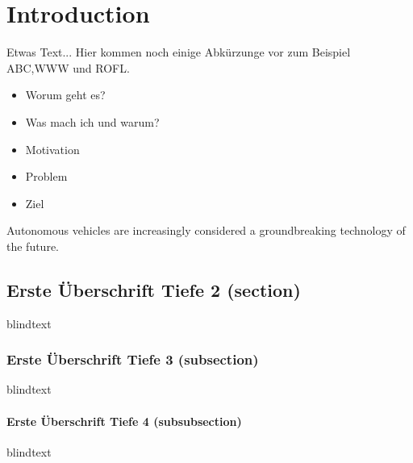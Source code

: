 \chapter{Introduction}
Etwas Text... Hier kommen noch einige Abkürzunge vor zum Beispiel \ac{ABC},\ac{WWW} und \ac{ROFL}.

\begin{itemize}
    \item Worum geht es?
    \item Was mach ich und warum?
    \item Motivation
    \item Problem
    \item Ziel
\end{itemize}

Autonomous vehicles are increasingly considered a groundbreaking technology of the future. \cite{FraunhoferInstituteforCognitiveSystemsIKS.21.10.2024}

\section{Erste Überschrift Tiefe 2 (section)}
blindtext

\subsection{Erste Überschrift Tiefe 3 (subsection)}
blindtext

\subsubsection{Erste Überschrift Tiefe 4 (subsubsection)}
blindtext
\cite{orf2024toetlicherZugunfall}
